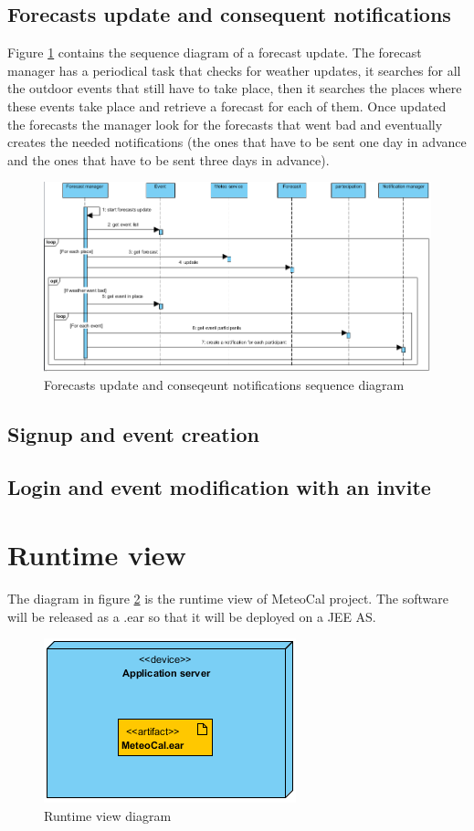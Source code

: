 \documentclass[10pt,a4paper,titlepage]{article}
\begin{document}
\subsection{Forecasts update and consequent notifications}
Figure \ref{fig:sequence_forecasts} contains the sequence diagram of a forecast update. The forecast manager has a periodical task that checks for weather updates, it searches for all the outdoor events that still have to take place, then it searches the places where these events take place and retrieve a forecast for each of them. Once updated the forecasts the manager look for the forecasts that went bad and eventually creates the needed notifications (the ones that have to be sent one day in advance and the ones that have to be sent three days in advance).
\begin{figure}[h]
\centering
\includegraphics[width=\linewidth]{./images/sequence_forecast_update}
\caption[forecast update]{Forecasts update and conseqeunt notifications sequence diagram}
\label{fig:sequence_forecasts}
\end{figure}

\subsection{Signup and event creation}
\subsection{Login and event modification with an invite}

\section{Runtime view}
The diagram in figure \ref{fig:runtime_view} is the runtime view of MeteoCal project. The software will be released as a .ear so that it will be deployed on a JEE AS.
\begin{figure}[h]
\centering
\includegraphics[width=0.5\linewidth]{./images/runtime_view}
\caption[runtime view]{Runtime view diagram}
\label{fig:runtime_view}
\end{figure}
\end{document}

